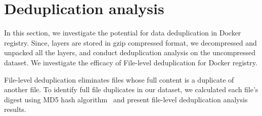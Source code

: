 \section{Deduplication analysis}
\label{sec:redundant_files}

In this section, we investigate the potential for data deduplication in Docker
registry.
%
Since, layers are stored in gzip compressed format, 
we decompressed and unpacked all the layers, and conduct
deduplication analysis on the uncompressed dataset.
%
%
We investigate the efficacy of File-level deduplication for Docker registry.
%

File-level deduplication eliminates files whose full content is a duplicate of
another file.
%
To identify full file duplicates in our dataset, we calculated each file's
digest using MD5 hash algorithm~\cite{MD5} and present file-level deduplication
analysis results.



